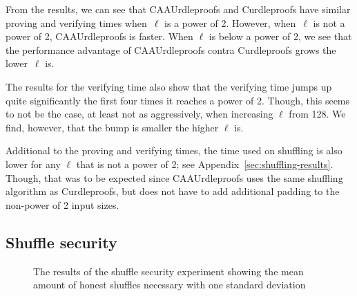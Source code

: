 From the results, we can see that CAAUrdleproofs and Curdleproofs have similar proving and verifying times when~$\ell$ is a power of 2.
However, when~$\ell$ is not a power of 2, CAAUrdleproofs is faster.
When $\ell$ is below a power of 2, we see that the performance advantage of CAAUrdleproofs contra Curdleproofs grows the lower~$\ell$ is.

The results for the verifying time also show that the verifying time jumps up quite significantly the first four times it reaches a power of 2.
Though, this seems to not be the case, at least not as aggressively, when increasing $\ell$ from 128.
We find, however, that the bump is smaller the higher $\ell$ is.

Additional to the proving and verifying times, the time used on shuffling is also lower for any $\ell$ that is not a power of 2; see Appendix~\ref{sec:shuffling-results}.
Though, that was to be expected since CAAUrdleproofs uses the same shuffling algorithm as Curdleproofs, but does not have to add additional padding to the non-power of 2 input sizes.



\subsection{Shuffle security}\label{subsec:Shuffle-security}

\begin{figure}[!htb]
    \centering
    \caption{The results of the shuffle security experiment showing the mean amount of honest shuffles necessary with one standard deviation}%
    \label{fig:shufflesecurity}%
\end{figure}

